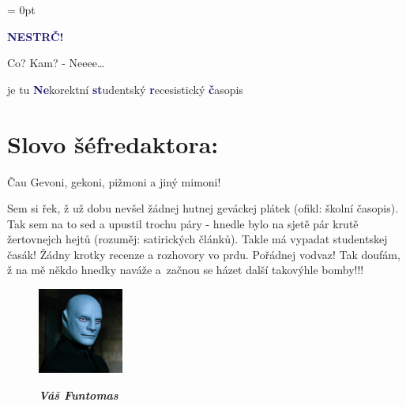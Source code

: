 \documentclass[twoside, 11pt]{article}
\begin{document}
\addtolength{\topmargin}{-10pt}
\addtolength{\textheight}{10pt}
\headheight = 0pt
\begin{center}
    \fontsize{45}{48}\selectfont \textcolor{MidnightBlue}{\textbf{NESTRČ!}}
 \end{center}


\vspace{-\baselineskip}
 \large Co? Kam? - Neeee\dots
 \begin{flushright}
    je tu \textcolor{MidnightBlue}{\textbf{Ne}}korektní \textcolor{MidnightBlue}{\textbf{st}}udentský \textcolor{MidnightBlue}{\textbf{r}}ecesistický \textcolor{MidnightBlue}{\textbf{č}}asopis
 \end{flushright}
 \section*{Slovo šéfredaktora:}
 Čau Gevoni, gekoni, pižmoni a jiný mimoni!

 Sem si řek, ž už dobu nevšel žádnej hutnej geváckej plátek (ofikl: školní
 časopis). Tak sem na to sed a upustil trochu páry - hnedle bylo na sjetě pár
 krutě žertovnejch hejtů (rozuměj: satirických článků). Takle má vypadat
 studentskej časák! Žádny krotky recenze a rozhovory vo prdu. Pořádnej
 vodvaz! Tak doufám, ž na mě někdo hnedky naváže a~začnou se házet další
 takovýhle bomby!!! 

 \begin{figure}
    \vspace*{-13pt}
    \includegraphics[width=0.25\textwidth]{funtomas}
    \vspace*{-23pt}
    \begin{flushright}
        \footnotesize{
        \textit{
        \textbf{Váš Funtomas}}}
    \end{flushright}
\end{figure}
\end{document}
